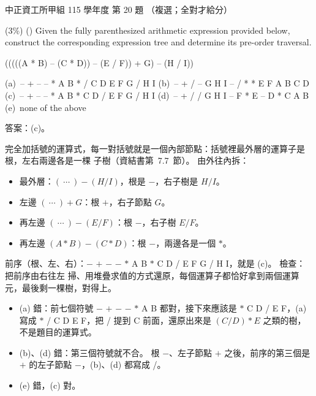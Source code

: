 \begin{pastexam}[label={px:ccu-115-swa-10}]{中正資工所甲組 115 學年度 第 20 題}
（複選；全對才給分）

(3\%) (\qquad) Given the fully parenthesized arithmetic expression provided below, construct the
corresponding expression tree and determine its pre-order traversal.
\begin{center}(((((A * B) -- (C * D)) -- (E / F)) + G) -- (H / I))\end{center}
(a)~-- + -- -- * A B * / C D E F G / H I \qquad (b)~-- + / -- G H I -- / * * E F A B C D\\
(c)~-- + -- -- * A B * C D / E F G / H I \qquad (d)~-- + / / G H I -- F * E -- D * C A B\\
(e)~none of the above
\end{pastexam}

\begin{pastsoln}
答案：(c)。

完全加括號的運算式，每一對括號就是一個內部節點：括號裡最外層的運算子是根，左右兩邊各是一棵
子樹（資結書第~7.7~節）。 由外往內拆：
\begin{itemize}
\item 最外層：$(\ \cdots\ ) - (H / I)$，根是 $-$，右子樹是 $H / I$。
\item 左邊 $(\ \cdots\ ) + G$：根 $+$，右子節點 $G$。
\item 再左邊 $(\ \cdots\ ) - (E / F)$：根 $-$，右子樹 $E / F$。
\item 再左邊 $(A * B) - (C * D)$：根 $-$，兩邊各是一個 $*$。
\end{itemize}
\begin{center}
\end{center}
前序（根、左、右）：$-$ $+$ $-$ $-$ $*$ A B $*$ C D / E F G / H I，就是 (c)。 檢查：把前序由右往左
掃、用堆疊求值的方式還原，每個運算子都恰好拿到兩個運算元，最後剩一棵樹，對得上。
\begin{itemize}
\item (a) 錯：前七個符號 $-$ $+$ $-$ $-$ $*$ A B 都對，接下來應該是 $*$ C D / E F，(a) 寫成
$*$ / C D E F，把 / 提到 C 前面，還原出來是 $(C / D) * E$ 之類的樹，不是題目的運算式。
\item (b)、(d) 錯：第三個符號就不合。 根 $-$、左子節點 $+$ 之後，前序的第三個是 $+$ 的左子節點
$-$，(b)、(d) 都寫成 /。
\item (e) 錯，(c) 對。
\end{itemize}
\end{pastsoln}
